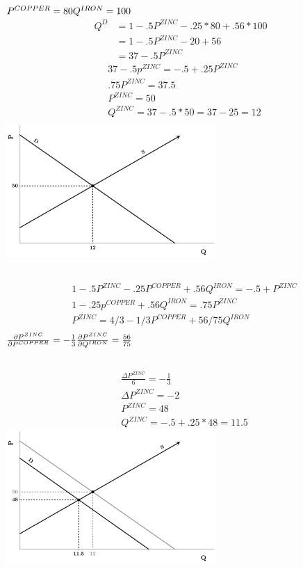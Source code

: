 \documentclass{article}
\begin{document}
	\subsection[a]{}
		$P^{COPPER}=80\\
		Q^{IRON}=100$
		\begin{align*}
		Q^D&=1-.5P^{ZINC}-.25*80+.56*100\\
		&=1-.5P^{ZINC}-20+56\\
		&=37-.5P^{ZINC}
		\end{align*}
		\begin{align*}
		&37-.5p^{ZINC}=-.5+.25P^{ZINC}\\
		&.75P^{ZINC}=37.5\\
		&P^{ZINC}=50\\
		&Q^{ZINC}=37-.5*50=37-25=12\\
		\end{align*}
		\includegraphics[height=2in]{Charts/5a}
	\subsection[b]{}
		\begin{align*}
		&1-.5P^{ZINC}-.25P^{COPPER}+.56Q^{IRON}=-.5+P^{ZINC}\\
		&1-.25p^{COPPER}+.56Q^{IRON}=.75P^{ZINC}\\
		&P^{ZINC}=4/3-1/3P^{COPPER}+56/75Q^{IRON}\\
		\end{align*}
		$\frac{\partial{P^{ZINC}}}{\partial{P^{COPPER}}}=-\frac{1}{3}\\
		\frac{\partial{P^{ZINC}}}{\partial{Q^{IRON}}}=\frac{56}{75}$
	\subsection[c]{}
		\begin{align*}
		&\frac{\Delta{P^{ZINC}}}{6}=-\frac{1}{3}\\
		&\Delta P^{ZINC}=-2\\
		&P^{ZINC}=48\\
		&Q^{ZINC}=-.5+.25*48=11.5
		\end{align*}
		\includegraphics[height=2in]{Charts/5c}
\end{document}
